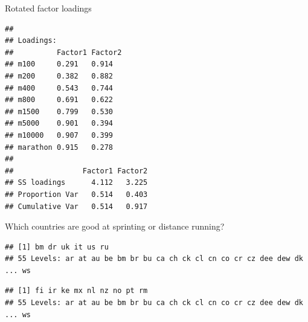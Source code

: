 \begin{frame}[fragile]{Rotated factor loadings}

  {\small
\begin{knitrout}
\color{fgcolor}\begin{kframe}
\begin{alltt}
\hlopt{$}
\end{alltt}
\begin{verbatim}
## 
## Loadings:
##          Factor1 Factor2
## m100     0.291   0.914  
## m200     0.382   0.882  
## m400     0.543   0.744  
## m800     0.691   0.622  
## m1500    0.799   0.530  
## m5000    0.901   0.394  
## m10000   0.907   0.399  
## marathon 0.915   0.278  
## 
##                Factor1 Factor2
## SS loadings      4.112   3.225
## Proportion Var   0.514   0.403
## Cumulative Var   0.514   0.917
\end{verbatim}
\end{kframe}
\end{knitrout}
  }
  
\end{frame}

\begin{frame}[fragile]{Which countries are good at sprinting or
    distance running?}
  
\begin{knitrout}
\color{fgcolor}\begin{kframe}
\begin{alltt}
\hlkwb{=}\hlopt{$}\hlstd{scores[,}\hlstd{]}\hlopt{<}\hlstd{(}\hlopt{-}\hlstd{)}
\hlstd{track[good.sprint,}\hlstd{]}
\end{alltt}
\begin{verbatim}
## [1] bm dr uk it us ru
## 55 Levels: ar at au be bm br bu ca ch ck cl cn co cr cz dee dew dk ... ws
\end{verbatim}
\begin{alltt}
\hlkwb{=}\hlopt{$}\hlstd{scores[,}\hlstd{]}\hlopt{<}\hlstd{(}\hlopt{-}\hlstd{)}
\hlstd{track[good.distance,}\hlstd{]}
\end{alltt}
\begin{verbatim}
## [1] fi ir ke mx nl nz no pt rm
## 55 Levels: ar at au be bm br bu ca ch ck cl cn co cr cz dee dew dk ... ws
\end{verbatim}
\end{kframe}
\end{knitrout}
  
\end{frame}



